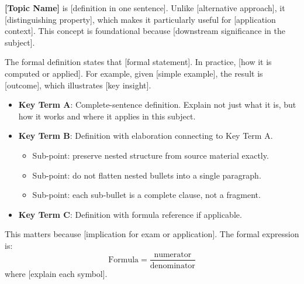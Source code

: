 \textbf{[Topic Name]} is [definition in one sentence]. Unlike [alternative approach],
it [distinguishing property], which makes it particularly useful for [application context].
This concept is foundational because [downstream significance in the subject].

The formal definition states that [formal statement]. In practice, [how it is computed
or applied]. For example, given [simple example], the result is [outcome], which
illustrates [key insight].

\begin{itemize}
    \item \textbf{Key Term A}: Complete-sentence definition. Explain not just what it is,
          but how it works and where it applies in this subject.
    \item \textbf{Key Term B}: Definition with elaboration connecting to Key Term A.
    \begin{itemize}
        \item Sub-point: preserve nested structure from source material exactly.
        \item Sub-point: do not flatten nested bullets into a single paragraph.
        \item Sub-point: each sub-bullet is a complete clause, not a fragment.
    \end{itemize}
    \item \textbf{Key Term C}: Definition with formula reference if applicable.
\end{itemize}

\begin{tcolorbox} This matters because
[implication for exam or application]. The formal expression is:
\[
    \text{Formula} = \frac{\text{numerator}}{\text{denominator}}
\]
where [explain each symbol].
\end{tcolorbox}

%

